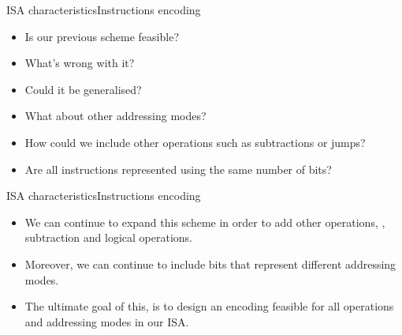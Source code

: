 \begin{frame}{\acs{ISA} characteristics}{Instructions encoding}
  \begin{itemize}
    \item Is our previous scheme feasible?
    \item What's wrong with it?
	\item Could it be generalised?   
    \item What about other addressing modes?  
    \item How could we include other operations such as subtractions or jumps?
    \item Are all instructions represented using the same number of bits?
  \end{itemize}     
\end{frame}

\begin{frame}{\acs{ISA} characteristics}{Instructions encoding}
\begin{itemize}
\item We can continue to expand this scheme in order to add other operations, \eg, subtraction and logical operations.
\item Moreover, we can continue to include bits that represent different addressing modes.
\item The ultimate goal of this, is to design an encoding feasible for all operations and addressing modes in our \ac{ISA}.
\end{itemize} 
\end{frame}


